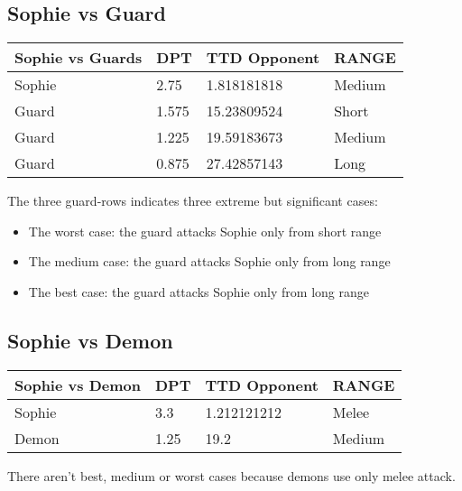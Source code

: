 \subsection{Sophie vs Guard}
\begin{table}[H]
  \centering
\begin{tabular}{|l|l|l|l|}
\hline
\rowcolor[HTML]{C0C0C0} 
\textbf{Sophie vs Guards} & \textbf{DPT} & \textbf{TTD Opponent} & \textbf{RANGE} \\ \hline
Sophie & 2.75 & 1.818181818 & Medium \\ \hline
Guard & 1.575 & 15.23809524 & Short \\ \hline
Guard & 1.225 & 19.59183673 & Medium \\ \hline
Guard & 0.875 & 27.42857143 & Long \\ \hline
\end{tabular}
\end{table}
The three guard-rows indicates three extreme but significant cases:
\begin{itemize}
\item The worst case: the guard attacks Sophie only from short range
\item The medium case: the guard attacks Sophie only from long range
\item The best case: the guard attacks Sophie only from long range
\end{itemize}

\subsection{Sophie vs Demon}
\begin{table}[H]
  \centering
\begin{tabular}{|l|l|l|l|}
\hline
\rowcolor[HTML]{C0C0C0} 
\textbf{Sophie vs Demon} & \textbf{DPT} & \textbf{TTD Opponent} & \textbf{RANGE} \\ \hline
Sophie & 3.3 & 1.212121212 & Melee \\ \hline
Demon & 1.25 & 19.2 & Medium \\ \hline
\end{tabular}
\end{table}
There aren't best, medium or worst cases because demons use only melee attack.


